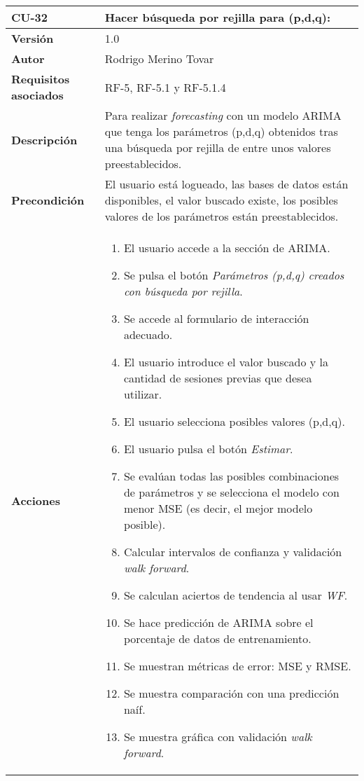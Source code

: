 \begin{table}[p]
	\centering
	\begin{tabularx}{\linewidth}{ p{} p{} }
		\toprule
		\textbf{CU-32}    & \textbf{Hacer búsqueda por rejilla para (p,d,q):}\\
		\toprule
		\textbf{Versión}              & 1.0    \\
		\textbf{Autor}                & Rodrigo Merino Tovar \\
		\textbf{Requisitos asociados} & RF-5, RF-5.1 y RF-5.1.4  \\
		\textbf{Descripción}          & Para realizar \emph{forecasting} con un modelo ARIMA que tenga los parámetros (p,d,q) obtenidos tras una búsqueda por rejilla de entre unos valores preestablecidos.\\
		\textbf{Precondición}         & El usuario está logueado, las bases de datos están disponibles, el valor buscado existe, los posibles valores de los parámetros están preestablecidos.  \\
		\textbf{Acciones}             &
		\begin{enumerate}
			\def\labelenumi{\arabic{enumi}.}
			\tightlist 
			\item El usuario accede a la sección de ARIMA.
			\item Se pulsa el botón \emph{Parámetros (p,d,q) creados con búsqueda por rejilla}. 
			\item Se accede al formulario de interacción adecuado. 
			\item El usuario introduce el valor buscado y la cantidad de sesiones previas que desea utilizar. 
			\item El usuario selecciona posibles valores (p,d,q).
			\item El usuario pulsa el botón \emph{Estimar}.
			\item Se evalúan todas las posibles combinaciones de parámetros y se selecciona el modelo con menor MSE (es decir, el mejor modelo posible). 
			\item Calcular intervalos de confianza y validación \emph{walk forward}.
			\item Se calculan aciertos de tendencia al usar \emph{WF}.
			\item Se hace predicción de ARIMA sobre el porcentaje de datos de entrenamiento.
			\item Se muestran métricas de error: MSE y RMSE. 
			\item Se muestra comparación con una predicción naíf.			
			\item Se muestra gráfica con validación \emph{walk forward}.

\end{enumerate}
\end{tabularx}
\end{table}
